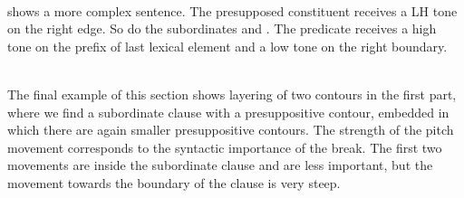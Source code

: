  \\


 shows a more complex sentence. The presupposed constituent  receives a LH tone on the right edge. So do the subordinates  and . The predicate  receives a high tone on the  prefix of last lexical element  and a low tone on the right boundary.


 \\
The final example of this section shows layering of two contours in the first part, where we find a subordinate clause with a presuppositive contour, embedded in which there are again smaller presuppositive contours. The strength of the pitch movement corresponds to the syntactic importance of the break. The first two movements are inside the subordinate clause and are less important, but the movement towards the boundary of the clause is very steep.

